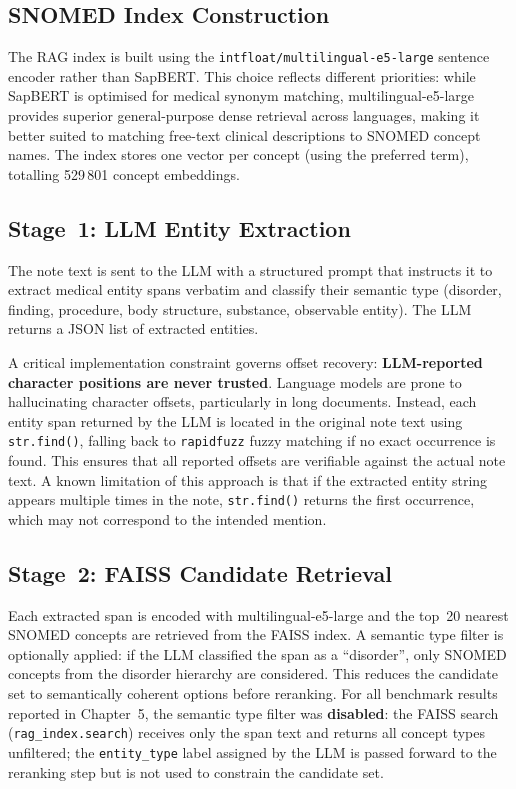 \subsection{SNOMED Index Construction}

The RAG index is built using the \texttt{intfloat/multilingual-e5-large} sentence encoder rather than SapBERT. This choice reflects different priorities: while SapBERT is optimised for medical synonym matching, multilingual-e5-large provides superior general-purpose dense retrieval across languages, making it better suited to matching free-text clinical descriptions to SNOMED concept names. The index stores one vector per concept (using the preferred term), totalling 529\,801 concept embeddings.

\subsection{Stage~1: LLM Entity Extraction}

The note text is sent to the LLM with a structured prompt that instructs it to extract medical entity spans verbatim and classify their semantic type (disorder, finding, procedure, body structure, substance, observable entity). The LLM returns a JSON list of extracted entities.

A critical implementation constraint governs offset recovery: \textbf{LLM-reported character positions are never trusted}. Language models are prone to hallucinating character offsets, particularly in long documents. Instead, each entity span returned by the LLM is located in the original note text using \texttt{str.find()}, falling back to \texttt{rapidfuzz} fuzzy matching if no exact occurrence is found. This ensures that all reported offsets are verifiable against the actual note text. A known limitation of this approach is that if the extracted entity string appears multiple times in the note, \texttt{str.find()} returns the first occurrence, which may not correspond to the intended mention.

\subsection{Stage~2: FAISS Candidate Retrieval}

Each extracted span is encoded with multilingual-e5-large and the top~20 nearest SNOMED concepts are retrieved from the FAISS index. A semantic type filter is optionally applied: if the LLM classified the span as a ``disorder'', only SNOMED concepts from the disorder hierarchy are considered. This reduces the candidate set to semantically coherent options before reranking. For all benchmark results reported in Chapter~5, the semantic type filter was \textbf{disabled}: the FAISS search (\texttt{rag\_index.search}) receives only the span text and returns all concept types unfiltered; the \texttt{entity\_type} label assigned by the LLM is passed forward to the reranking step but is not used to constrain the candidate set.

